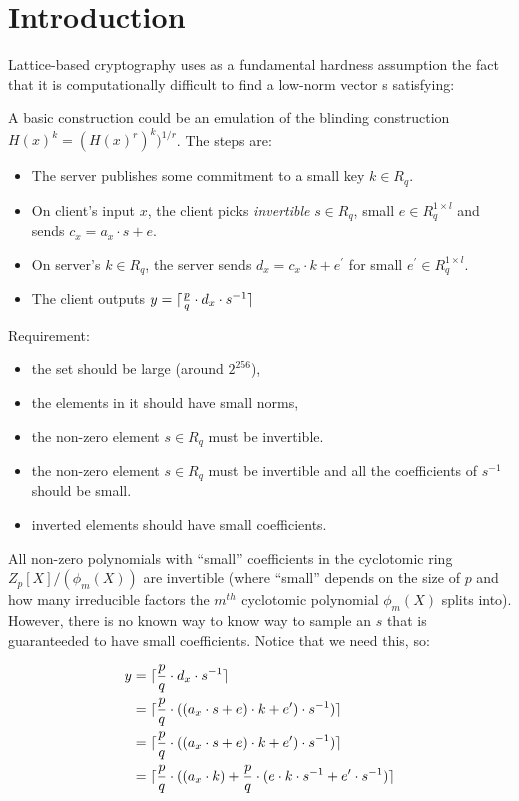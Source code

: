 \section{Introduction}%
\label{sec:introduction}

Lattice-based cryptography uses as a fundamental hardness assumption the fact that it is computationally difficult to find a low-norm vector s satisfying:

A basic construction could be an emulation of the blinding construction $H(x)^{k} = (H(x) ^{r})^{k}) ^ {1/r}$.
The steps are:

\begin{itemize}
  \item The server publishes some commitment to a small key $k \in R_q$.
  \item On client's input $x$, the client picks \emph{invertible} $s \in R_q$, small $e \in R^{1 \times l}_q$ and sends $c_x = a_x \cdot s + e$.
  \item On server's $k \in R_q$, the server sends $d_x = c_x \cdot k + e^{\prime}$ for small $e^{\prime} \in R^{1 \times l}_q$.
  \item The client outputs $y = \lceil {p \over q} \cdot d_x \cdot s^{-1} \rceil$
\end{itemize}

Requirement:

\begin{itemize}
  \item the set should be large (around $2^{256}$),
  \item the elements in it should have small norms,
  \item the non-zero element $s \in R_q$ must be invertible.
  \item the non-zero element $s \in R_q$ must be invertible and all the coefficients of $s^{-1}$ should be small.
  \item inverted elements should have small coefficients.
\end{itemize}

All non-zero polynomials with ``small'' coefficients in the cyclotomic ring $Z_p[X]/(\phi_m(X))$ are invertible (where ``small'' depends on the size of $p$ and how many irreducible factors the $m^{th}$ cyclotomic polynomial $\phi_m(X)$ splits into).
However, there is no known way to know way to sample an $s$ that is guaranteeded to have small coefficients.
Notice that we need this, so:

\begin{equation} \label{eq1}
\begin{split}
y &= \lceil {p \over q} \cdot d_x \cdot s^{-1} \rceil\\
 & = \lceil {p \over q} \cdot ((a_x \cdot s + e) \cdot k + e') \cdot s^{-1}) \rceil \\
 & = \lceil {p \over q} \cdot ((a_x \cdot s + e) \cdot k + e') \cdot s^{-1}) \rceil \\
 & = \lceil {p \over q} \cdot ((a_x \cdot k) + {p \over q} \cdot (e \cdot k \cdot s^{-1} + e' \cdot s^{-1})  \rceil \\
\end{split}
\end{equation}


